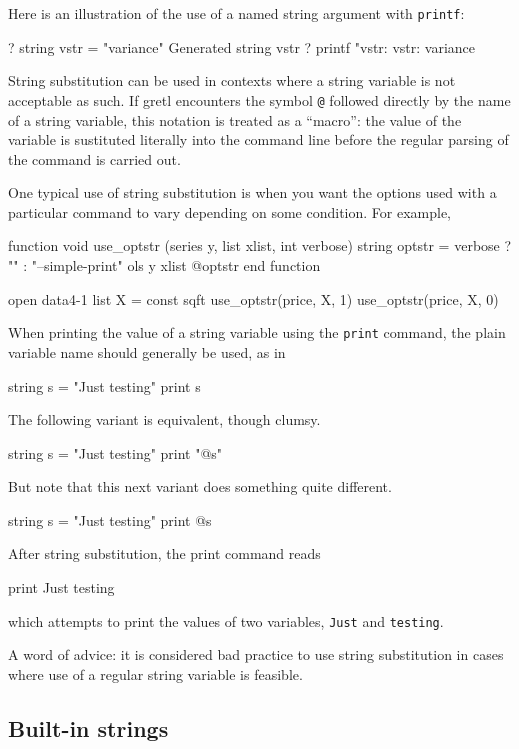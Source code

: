 Here is an illustration of the use of a named string argument with
\texttt{printf}:
%
\begin{code}
? string vstr = "variance"
Generated string vstr
? printf "vstr: %
vstr:     variance
\end{code}

String substitution can be used in contexts where a string variable is
not acceptable as such. If gretl encounters the symbol \verb|@|
followed directly by the name of a string variable, this notation is
treated as a ``macro'': the value of the variable is sustituted
literally into the command line before the regular parsing of the
command is carried out.

One typical use of string substitution is when you want the options used
with a particular command to vary depending on some condition. For
example,
%
\begin{code}
function void use_optstr (series y, list xlist, int verbose)
   string optstr = verbose ? "" : "--simple-print"
   ols y xlist @optstr 
end function

open data4-1
list X = const sqft
use_optstr(price, X, 1)
use_optstr(price, X, 0)
\end{code} 

When printing the value of a string variable using the \texttt{print}
command, the plain variable name should generally be used, as in
%
\begin{code}
string s = "Just testing"
print s
\end{code}
%
The following variant is equivalent, though clumsy.
%
\begin{code}
string s = "Just testing"
print "@s"
\end{code}
%
But note that this next variant does something quite different.
%
\begin{code}
string s = "Just testing"
print @s
\end{code}
%
After string substitution, the print command reads
%
\begin{code}
print Just testing
\end{code}
%
which attempts to print the values of two variables, \texttt{Just} and
\texttt{testing}.

A word of advice: it is considered bad practice to use string
substitution in cases where use of a regular string variable is
feasible.

\subsection{Built-in strings}

